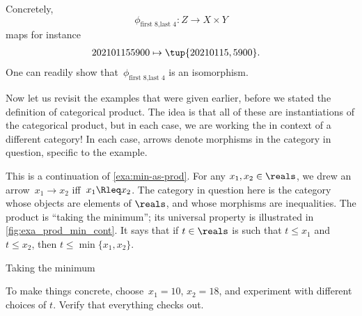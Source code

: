 \begin{example}
    Concretely,~
    \begin{equation}
        \label{eq:exa-univ-iso}
        \phi_{\text{first 8},\text{last 4}}: Z \to X\times Y
    \end{equation}
    maps for instance
    \begin{equation}
        \label{eq:exa-univ-iso-concrete}
        \begin{aligned}
            202101155900&\mapsto \tup{20210115,5900}.
        \end{aligned}
    \end{equation}
    One can readily show that~$\phi_{\text{first 8},\text{last 4}}$ is an isomorphism.
\end{example}

Now let us revisit the examples that were given earlier, before we stated the definition of categorical product. The idea is that all of these are instantiations of the categorical product, but in each case, we are working the in context of a different category! In each case, arrows denote morphisms in the category in question, specific to the example.


\begin{example}
    \label{exa:min-as-prod-cont}
    This is a continuation of \cref{exa:min-as-prod}. For any $x_1,x_2\in \reals$, we drew an arrow~$x_1\to x_2$ iff~$x_1\Rleq x_2$. The category in question here is the category whose objects are elements of $\reals$, and whose morphisms are inequalities. The product is ``taking the minimum''; its universal property is illustrated in \cref{fig:exa_prod_min_cont}. It says that if $t \in \reals$ is such that $t \leq x_1$ and $t \leq x_2$, then $t \leq \min \{ x_1, x_2 \}$.
    \begin{marginfigure}
        \centering
        \caption{Taking the minimum}
        \label{fig:exa_prod_min_cont}
    \end{marginfigure}
    To make things concrete, choose~$x_1 = 10$, $x_2 = 18$, and experiment with different choices of $t$. Verify that everything checks out.
\end{example}

